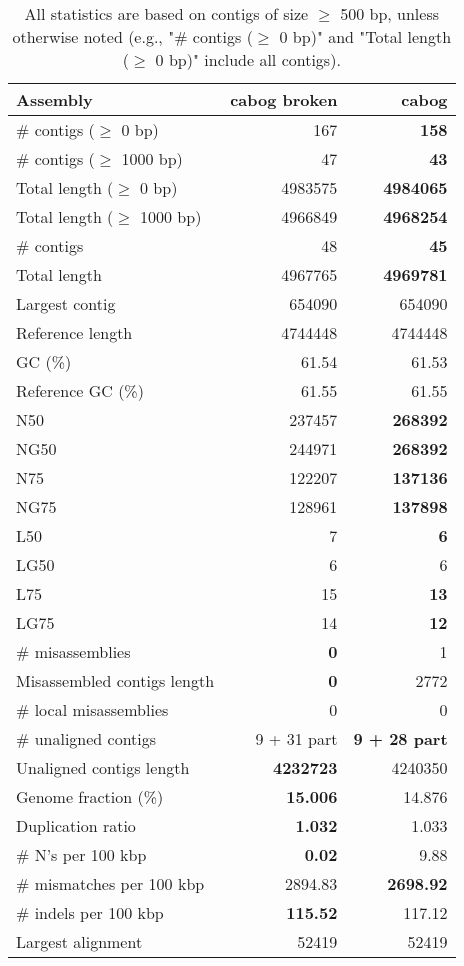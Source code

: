 \documentclass[12pt,a4paper]{article}
\begin{document}
\begin{table}[ht]
\begin{center}
\caption{All statistics are based on contigs of size $\geq$ 500 bp, unless otherwise noted (e.g., "\# contigs ($\geq$ 0 bp)" and "Total length ($\geq$ 0 bp)" include all contigs).}
\begin{tabular}{|l*{2}{|r}|}
\hline
Assembly & cabog broken & cabog \\ \hline
\# contigs ($\geq$ 0 bp) & 167 & {\bf 158} \\ \hline
\# contigs ($\geq$ 1000 bp) & 47 & {\bf 43} \\ \hline
Total length ($\geq$ 0 bp) & 4983575 & {\bf 4984065} \\ \hline
Total length ($\geq$ 1000 bp) & 4966849 & {\bf 4968254} \\ \hline
\# contigs & 48 & {\bf 45} \\ \hline
Total length & 4967765 & {\bf 4969781} \\ \hline
Largest contig & 654090 & 654090 \\ \hline
Reference length & 4744448 & 4744448 \\ \hline
GC (\%) & 61.54 & 61.53 \\ \hline
Reference GC (\%) & 61.55 & 61.55 \\ \hline
N50 & 237457 & {\bf 268392} \\ \hline
NG50 & 244971 & {\bf 268392} \\ \hline
N75 & 122207 & {\bf 137136} \\ \hline
NG75 & 128961 & {\bf 137898} \\ \hline
L50 & 7 & {\bf 6} \\ \hline
LG50 & 6 & 6 \\ \hline
L75 & 15 & {\bf 13} \\ \hline
LG75 & 14 & {\bf 12} \\ \hline
\# misassemblies & {\bf 0} & 1 \\ \hline
Misassembled contigs length & {\bf 0} & 2772 \\ \hline
\# local misassemblies & 0 & 0 \\ \hline
\# unaligned contigs & 9 + 31 part & {\bf 9 + 28 part} \\ \hline
Unaligned contigs length & {\bf 4232723} & 4240350 \\ \hline
Genome fraction (\%) & {\bf 15.006} & 14.876 \\ \hline
Duplication ratio & {\bf 1.032} & 1.033 \\ \hline
\# N's per 100 kbp & {\bf 0.02} & 9.88 \\ \hline
\# mismatches per 100 kbp & 2894.83 & {\bf 2698.92} \\ \hline
\# indels per 100 kbp & {\bf 115.52} & 117.12 \\ \hline
Largest alignment & 52419 & 52419 \\ \hline
\end{tabular}
\end{center}
\end{table}
\end{document}
